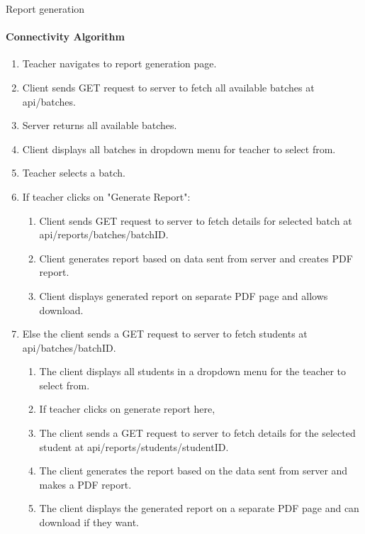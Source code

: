 \begin{frame}{Report generation}
\framesubtitle{Connectivity Algorithm}
    \begin{enumerate}
        

\item Teacher navigates to report generation page.
\item Client sends GET request to server to fetch all available batches at api/batches.
\item Server returns all available batches.
\item Client displays all batches in dropdown menu for teacher to select from.
\item Teacher selects a batch.
\item If teacher clicks on "Generate Report":
    \begin{enumerate}
       
    
   \item Client sends GET request to server to fetch details for selected batch at api/reports/batches/{batchID}.
   \item Client generates report based on data sent from server and creates PDF report.
    \item Client displays generated report on separate PDF page and allows download.
    \end{enumerate}
\item  Else the client sends a GET request to server to fetch students at api/batches/{batchID}.
\begin{enumerate}
     

   \item The client displays all students in a dropdown menu for the teacher to select from.
 \item If teacher clicks on generate report here,
   \item The client sends a GET request to server to fetch details for the selected student at api/reports/students/{studentID}.
    \item The client generates the report based on the data sent from server and makes a PDF report.
    \item The client displays the generated report on a separate PDF page and can download if they want.
    \end{enumerate}
    \end{enumerate}
    
\end{frame}